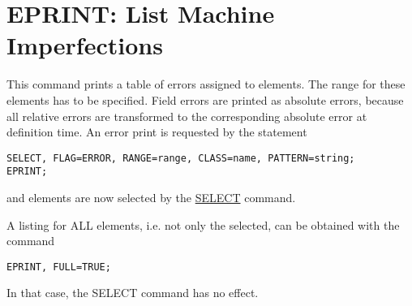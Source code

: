 
\section{EPRINT: List Machine Imperfections}  
This command prints a table of errors assigned to elements. The range
for these elements has to be specified. Field errors are printed as
absolute errors, because all relative errors are transformed to the
corresponding absolute error at definition time. An error print is
requested by the statement  

\begin{verbatim}
SELECT, FLAG=ERROR, RANGE=range, CLASS=name, PATTERN=string;
EPRINT;
\end{verbatim}
and elements are now selected by the
\href{../Introduction/select.html}{SELECT} command.  


A listing for ALL elements, i.e. not only the selected, can be obtained
with the command  
\begin{verbatim}
EPRINT, FULL=TRUE;
\end{verbatim} 
In that case, the SELECT command has no effect.

